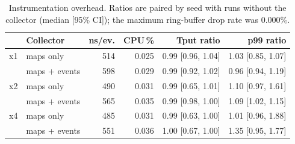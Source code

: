 \begin{table}[t]
\centering
\footnotesize
\caption{Instrumentation overhead. Ratios are paired by seed with runs without the collector (median [95\% CI]); the maximum ring-buffer drop rate was 0.000\%.}
\label{tab:overhead}
\setlength{\tabcolsep}{3.5pt}
\begin{tabular}{@{}llrrrr@{}}
\toprule
& Collector & ns/ev. & CPU\,\% & Tput ratio & p99 ratio \\
\midrule
x1 & maps only & 514 & 0.025 & 0.99 {\scriptsize[0.96, 1.04]} & 1.03 {\scriptsize[0.85, 1.07]} \\
 & maps + events & 598 & 0.029 & 0.99 {\scriptsize[0.92, 1.02]} & 0.96 {\scriptsize[0.94, 1.19]} \\
x2 & maps only & 490 & 0.031 & 0.99 {\scriptsize[0.65, 1.01]} & 1.10 {\scriptsize[0.97, 1.61]} \\
 & maps + events & 565 & 0.035 & 0.99 {\scriptsize[0.98, 1.00]} & 1.09 {\scriptsize[1.02, 1.15]} \\
x4 & maps only & 485 & 0.031 & 0.99 {\scriptsize[0.63, 1.00]} & 1.01 {\scriptsize[0.96, 1.88]} \\
 & maps + events & 551 & 0.036 & 1.00 {\scriptsize[0.67, 1.00]} & 1.35 {\scriptsize[0.95, 1.77]} \\
\bottomrule
\end{tabular}
\end{table}

